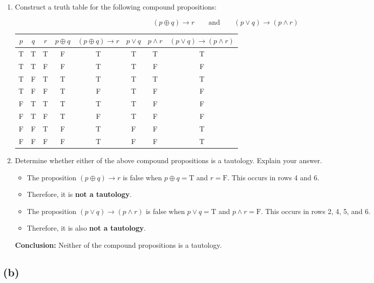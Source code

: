 \documentclass{article}
\begin{document}
\begin{enumerate}[label=\roman*.]

\item Construct a truth table for the following compound propositions:

\[
(p \oplus q) \to r \qquad \text{and} \qquad (p \lor q) \to (p \land r)
\]

\begin{center}
\begin{tabular}{|c|c|c||c|c|c||c|c|}
\hline
$p$ & $q$ & $r$ & $p \oplus q$ & $(p \oplus q) \to r$ & $p \lor q$ & $p \land r$ & $(p \lor q) \to (p \land r)$ \\
\hline
T & T & T & F & T & T & T & T \\
T & T & F & F & T & T & F & F \\
T & F & T & T & T & T & T & T \\
T & F & F & T & F & T & F & F \\
F & T & T & T & T & T & F & F \\
F & T & F & T & F & T & F & F \\
F & F & T & F & T & F & F & T \\
F & F & F & F & T & F & F & T \\
\hline
\end{tabular}
\end{center}

\item Determine whether either of the above compound propositions is a tautology. Explain your answer.

\begin{itemize}
  \item The proposition \( (p \oplus q) \to r \) is false when \( p \oplus q = \text{T} \) and \( r = \text{F} \). This occurs in rows 4 and 6.
  \item Therefore, it is \textbf{not a tautology}.
  \item The proposition \( (p \lor q) \to (p \land r) \) is false when \( p \lor q = \text{T} \) and \( p \land r = \text{F} \). This occurs in rows 2, 4, 5, and 6.
  \item Therefore, it is also \textbf{not a tautology}.
\end{itemize}

\textbf{Conclusion:} Neither of the compound propositions is a tautology.
\end{enumerate}

\subsection*{(b)}
\end{document}
